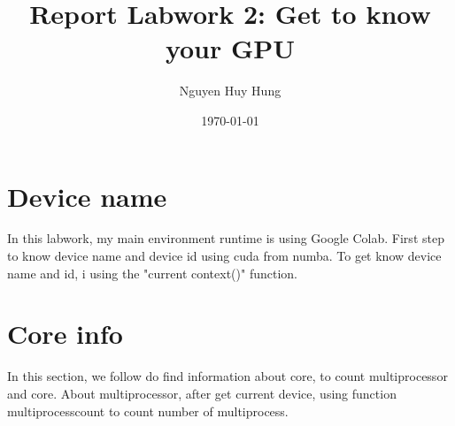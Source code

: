 \documentclass{article} \title{Report Labwork 2: Get to know your GPU}
\author{Nguyen Huy Hung}
\date{\today}
\begin{document}
 
\maketitle 
\section{Device name} 
In this labwork, my main environment runtime is using Google Colab.
First step to know device name and device id using cuda from numba. To get know device name and id, i using the "current context()" function.

\section{Core info}
In this section, we follow do find information about core, to count multiprocessor and core.
About multiprocessor, after get current device, using function multiprocesscount to count number of multiprocess.
\end{document}

